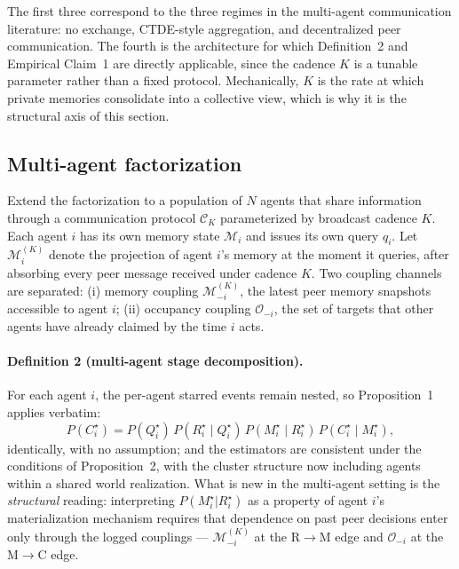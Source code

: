 \documentclass{article}
\begin{document}
The first three correspond to the three regimes in the multi-agent
communication literature: no exchange, CTDE-style aggregation, and
decentralized peer communication. The fourth is the architecture for
which Definition~2 and Empirical Claim~1 are directly
applicable, since the cadence $K$ is a tunable parameter rather than a
fixed protocol. Mechanically, $K$ is the rate at which private
memories consolidate into a collective view, which is why it is the
structural axis of this section.

\subsection{Multi-agent factorization}
\label{p1:sec:multi-theory}

Extend the factorization to a population of $N$ agents that share
information through a communication protocol $\mathcal{C}_K$
parameterized by broadcast cadence $K$. Each agent $i$ has its own
memory state $\mathcal{M}_i$ and issues its own query $q_i$. Let
$\mathcal{M}_i^{(K)}$ denote the projection of agent $i$'s memory at
the moment it queries, after absorbing every peer message received
under cadence $K$. Two coupling channels are separated: (i) memory
coupling $\mathcal{M}_{-i}^{(K)}$, the latest peer memory snapshots
accessible to agent $i$; (ii) occupancy coupling $\mathcal{O}_{-i}$,
the set of targets that other agents have already claimed by the time
$i$ acts.

\paragraph{Definition 2 (multi-agent stage decomposition).}
For each agent $i$, the per-agent starred events remain nested, so
Proposition~1 applies verbatim:
\[
P(C^\star_i)
=
P(Q^\star_i)\,
P(R^\star_i \mid Q^\star_i)\,
P(M^\star_i \mid R^\star_i)\,
P(C^\star_i \mid M^\star_i),
\]
identically, with no assumption; and the estimators are consistent
under the conditions of Proposition~2, with the cluster structure now
including agents within a shared world realization. What is new in the
multi-agent setting is the \emph{structural} reading: interpreting
$P(M^\star_i|R^\star_i)$ as a property of agent $i$'s materialization
mechanism requires that dependence on past peer decisions enter only
through the logged couplings --- $\mathcal{M}_{-i}^{(K)}$ at the
R$\to$M edge and $\mathcal{O}_{-i}$ at the M$\to$C edge.
\end{document}
